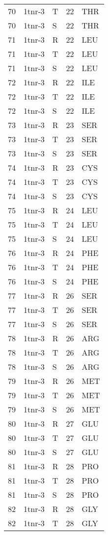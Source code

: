 \begin{longtable}[l]{l|l|l|l|l}
	70 & 1tnr-3 & T & 22 & THR \\
	70 & 1tnr-3 & S & 22 & THR \\
	71 & 1tnr-3 & R & 22 & LEU \\
	71 & 1tnr-3 & T & 22 & LEU \\
	71 & 1tnr-3 & S & 22 & LEU \\
	72 & 1tnr-3 & R & 22 & ILE \\
	72 & 1tnr-3 & T & 22 & ILE \\
	72 & 1tnr-3 & S & 22 & ILE \\
	73 & 1tnr-3 & R & 23 & SER \\
	73 & 1tnr-3 & T & 23 & SER \\
	73 & 1tnr-3 & S & 23 & SER \\
	74 & 1tnr-3 & R & 23 & CYS \\
	74 & 1tnr-3 & T & 23 & CYS \\
	74 & 1tnr-3 & S & 23 & CYS \\
	75 & 1tnr-3 & R & 24 & LEU \\
	75 & 1tnr-3 & T & 24 & LEU \\
	75 & 1tnr-3 & S & 24 & LEU \\
	76 & 1tnr-3 & R & 24 & PHE \\
	76 & 1tnr-3 & T & 24 & PHE \\
	76 & 1tnr-3 & S & 24 & PHE \\
	77 & 1tnr-3 & R & 26 & SER \\
	77 & 1tnr-3 & T & 26 & SER \\
	77 & 1tnr-3 & S & 26 & SER \\
	78 & 1tnr-3 & R & 26 & ARG \\
	78 & 1tnr-3 & T & 26 & ARG \\
	78 & 1tnr-3 & S & 26 & ARG \\
	79 & 1tnr-3 & R & 26 & MET \\
	79 & 1tnr-3 & T & 26 & MET \\
	79 & 1tnr-3 & S & 26 & MET \\
	80 & 1tnr-3 & R & 27 & GLU \\
	80 & 1tnr-3 & T & 27 & GLU \\
	80 & 1tnr-3 & S & 27 & GLU \\
	81 & 1tnr-3 & R & 28 & PRO \\
	81 & 1tnr-3 & T & 28 & PRO \\
	81 & 1tnr-3 & S & 28 & PRO \\
	82 & 1tnr-3 & R & 28 & GLY \\
	82 & 1tnr-3 & T & 28 & GLY \\

\end{longtable}
